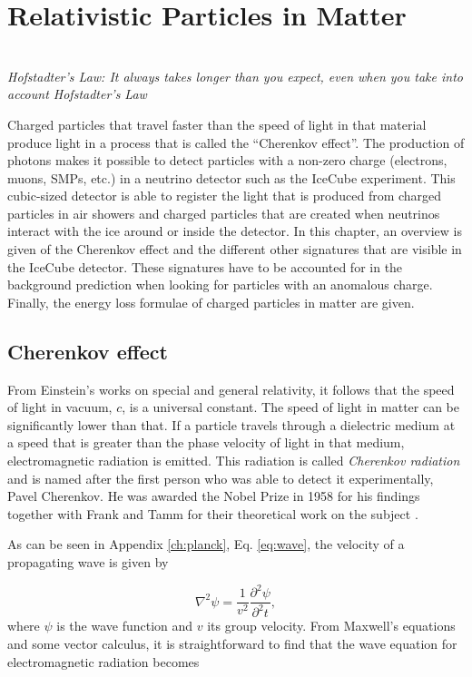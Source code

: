 \chapter{Relativistic Particles in Matter}
\label{ch:cherenkov}
\begin{flushright}
\textit{\\Hofstadter's Law: It always takes longer than you expect, even when you take into account Hofstadter's Law\\}
\end{flushright}

\noindent Charged particles that travel faster than the speed of light in that material produce light in a process that is called the ``Cherenkov effect''. The production of photons makes it possible to detect particles with a non-zero charge (electrons, muons, SMPs, etc.) in a neutrino detector such as the IceCube experiment. This cubic-sized detector is able to register the light that is produced from charged particles in air showers and charged particles that are created when neutrinos interact with the ice around or inside the detector. In this chapter, an overview is given of the Cherenkov effect and the different other signatures that are visible in the IceCube detector. These signatures have to be accounted for in the background prediction when looking for particles with an anomalous charge. Finally, the energy loss formulae of charged particles in matter are given.


\section{Cherenkov effect}
From Einstein's works on special and general relativity, it follows that the speed of light in vacuum, $c$, is a universal constant. The speed of light in matter can be significantly lower than that. If a particle travels through a dielectric medium at a speed that is greater than the phase velocity of light in that medium, electromagnetic radiation is emitted. This radiation is called \textit{Cherenkov radiation} and is named after the first person who was able to detect it experimentally, Pavel Cherenkov. He was awarded the Nobel Prize in 1958 for his findings together with Frank and Tamm for their theoretical work on the subject \cite{nobel1958url}.

As can be seen in Appendix \ref{ch:planck}, Eq. \ref{eq:wave}, the velocity of a propagating wave is given by

\begin{equation}
\nabla^2\psi = \frac{1}{v^2} \frac{\partial^2 \psi}{\partial^2 t},
\end{equation}
where $\psi$ is the wave function and $v$ its group velocity. From Maxwell's equations and some vector calculus, it is straightforward to find that the wave equation for electromagnetic radiation becomes

